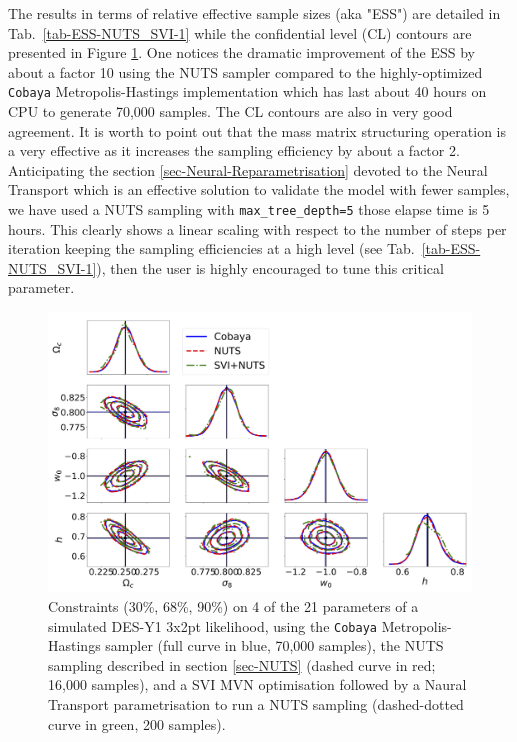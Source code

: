 \documentclass[final,5p,times,twocolumn,authoryear]{elsarticle}
\begin{document}
The results in terms of relative effective sample sizes (aka "ESS") are detailed in Tab.~\ref{tab-ESS-NUTS_SVI-1} while the confidential level (CL) contours are presented in Figure \ref{fig_cobaya_NUTS_SVI}. One notices the dramatic improvement of the ESS by about a factor 10 using the NUTS sampler compared to the highly-optimized \texttt{Cobaya}  Metropolis-Hastings implementation \citep{2019ascl.soft10019T,2021JCAP...05..057T} which has last about 40 hours on CPU to generate 70,000 samples. The CL contours are also in very good agreement. It is worth to point out that the mass matrix structuring operation is a very effective as it increases the sampling efficiency by about a factor 2.   Anticipating the section \ref{sec-Neural-Reparametrisation} devoted to the Neural Transport which is an effective solution to validate the model with fewer samples, we have used a NUTS sampling with \texttt{max\_tree\_depth=5} those elapse time is 5 hours. This clearly shows a linear scaling with respect to the number of steps per iteration keeping the sampling efficiencies at a high level (see Tab.~\ref{tab-ESS-NUTS_SVI-1}), then the user is highly encouraged to tune this critical parameter. 
%
\begin{figure}
\centering
\includegraphics[width=1.5\columnwidth]{figures/Cobaya-NUTS-SVI200.png}
\caption{Constraints (30\%, 68\%, 90\%) on 4 of the 21 parameters of a simulated DES-Y1 3x2pt likelihood, using the \texttt{Cobaya} Metropolis-Hastings sampler (full curve in blue, 70,000 samples), the  NUTS sampling described in section \ref{sec-NUTS} (dashed curve in red; 16,000 samples), and a SVI MVN optimisation followed by a Naural Transport parametrisation to run a NUTS sampling (dashed-dotted curve in green, 200 samples).}
\label{fig_cobaya_NUTS_SVI}
\end{figure}
\end{document}
